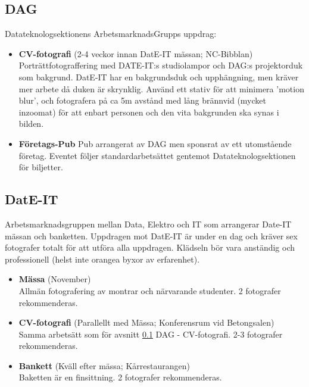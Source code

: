 \subsection{DAG}
\label{Specificerade uppdrag - DAG}
Datateknologsektionens ArbetsmarknadsGrupps uppdrag:
\begin{itemize}
    \item \textbf{CV-fotografi} (2-4 veckor innan DatE-IT mässan; NC-Bibblan)\\
    Porträttfotograffering med DATE-IT:s studiolampor och DAG:s projektorduk som bakgrund. DatE-IT har en bakgrundsduk och upphängning, men kräver mer arbete då duken är skrynklig. Använd ett stativ för att minimera 'motion blur', och fotografera på ca 5m avstånd med lång brännvid (mycket inzoomat) för att enbart personen och den vita bakgrunden ska synas i bilden. 
    \item \textbf{Företags-Pub}
    Pub arrangerat av DAG men sponsrat av ett utomstående företag. Eventet följer standardarbetsättet gentemot Datateknologsektionen för biljetter. 
    
\end{itemize}

\subsection{DatE-IT}
Arbetsmarknadsgruppen mellan Data, Elektro och IT som arrangerar Date-IT mässan och banketten. Uppdragen mot DatE-IT är under en dag och kräver sex fotografer totalt för att utföra alla uppdragen. Klädseln bör vara anständig och professionell (helst inte orangea byxor av erfarenhet).
\begin{itemize}
    \item \textbf{Mässa} (November)\\
    Allmän fotografering av montrar och närvarande studenter. 
    2 fotografer rekommenderas.
    \item \textbf{CV-fotografi} (Parallellt med Mässa; Konferensrum vid Betongsalen)\\
    Samma arbetsätt som för avsnitt \ref{Specificerade uppdrag - DAG} DAG - CV-fotografi. 2-3 fotografer rekommenderas.
    \item \textbf{Bankett} (Kväll efter mässa; Kårrestaurangen)\\
    Baketten är en finsittning. 2 fotografer rekommenderas. 
\end{itemize}


